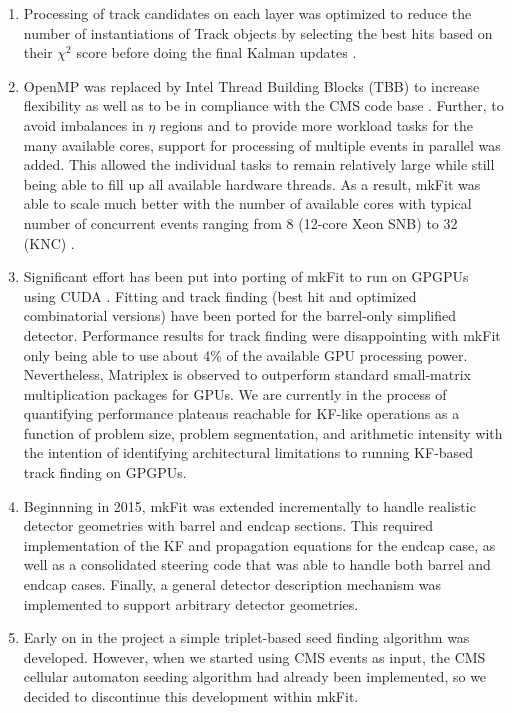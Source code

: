 \documentclass{webofc}
\def\mkfit{mkFit\xspace}
\begin{document}
\begin{enumerate}\topsep-2pt\itemsep-2pt

\item Processing of track candidates on each layer was optimized to
  reduce the number of instantiations of Track objects by selecting the best
  hits based on their $\chi^2$ score before doing the final Kalman updates
  \cite{pkf-clone-engine}.

\item OpenMP was replaced by Intel Thread Building Blocks (TBB) to increase
  flexibility as well as to be in compliance with the CMS code base
  \cite{pkf-tbb}. Further, to avoid imbalances in $\eta$ regions and to provide
  more workload tasks for the many available cores, support for processing of
  multiple events in parallel was added. This allowed the individual tasks
  to remain relatively large while still being able to fill up all available
  hardware threads. As a result, \mkfit was able to scale much better with
  the number of available cores with typical number of concurrent events ranging
  from 8 (12-core Xeon SNB) to 32 (KNC) \cite{pkf-acat-17}.

\item Significant effort has been put into porting of \mkfit to run on GPGPUs
  using CUDA \cite{pkf-gpu}. Fitting and track finding (best hit and optimized
  combinatorial versions) have been ported for the barrel-only simplified
  detector. Performance results for track finding were disappointing with \mkfit
  only being able to use about 4\% of the available GPU processing
  power. Nevertheless,
  Matriplex is observed to outperform standard small-matrix multiplication
  packages for GPUs. We are currently in the process of quantifying performance
  plateaus reachable for KF-like operations as a function of problem size,
  problem segmentation, and arithmetic intensity with the intention of
  identifying architectural limitations to running KF-based track finding on
  GPGPUs.

\item Beginnning in 2015, \mkfit was extended incrementally to handle realistic
  detector geometries with barrel and endcap sections. This required
  implementation of the KF and propagation equations for the endcap case, as
  well as a consolidated steering code that was able to handle both barrel and
  endcap cases. Finally, a general detector description mechanism was
  implemented to support arbitrary detector geometries.

\item Early on in the project a simple triplet-based seed finding algorithm
  was developed. However, when we started using CMS events as input, the CMS
  cellular automaton seeding algorithm
  had already been implemented, so we decided to discontinue
  this development within \mkfit.


\end{enumerate}
\end{document}
